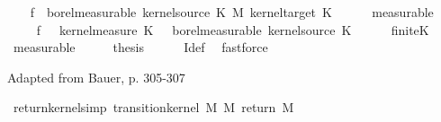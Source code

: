 \begin{isabellebody}
\ \ \isamarkupfalse%
\ {\isachardoublequoteopen}{\isacharquery}{\kern0pt}f{\isacharprime}{\kern0pt}\ {\isasymin}\ borel{\isacharunderscore}{\kern0pt}measurable\ {\isacharparenleft}{\kern0pt}kernel{\isacharunderscore}{\kern0pt}source\ K\ {\isasymOtimes}\isactrlsub M\ kernel{\isacharunderscore}{\kern0pt}target\ K{\isacharparenright}{\kern0pt}{\isachardoublequoteclose}\isanewline
\ \ \ \ \isamarkupfalse%
\ measurable\isanewline
\ \ \isamarkupfalse%
\ \isamarkupfalse%
\ {\isachardoublequoteopen}{\isacharparenleft}{\kern0pt}{\isasymlambda}{\isasymomega}\ {\isasymintegral}\isactrlsup {\isacharplus}{\kern0pt}{\isasymomega}\ {\isacharquery}{\kern0pt}f{\isacharprime}{\kern0pt}\ {\isacharparenleft}{\kern0pt}{\isasymomega}\ {\isasymomega}\ {\isasympartial}kernel{\isacharunderscore}{\kern0pt}measure\ K\ {\isasymomega}\ {\isasymin}\ borel{\isacharunderscore}{\kern0pt}measurable\ {\isacharparenleft}{\kern0pt}kernel{\isacharunderscore}{\kern0pt}source\ K{\isacharparenright}{\kern0pt}{\isachardoublequoteclose}\isanewline
\ \ \ \ \isamarkupfalse%
\ finite{\isacharunderscore}{\kern0pt}K\ \isamarkupfalse%
\ measurable\isanewline
\ \ \isamarkupfalse%
\ \isamarkupfalse%
\ {\isacharquery}{\kern0pt}thesis\isanewline
\ \ \ \ \isamarkupfalse%
\ I{\isacharunderscore}{\kern0pt}def\ \isamarkupfalse%
\ fastforce\isanewline
{}\isamarkupfalse%
%
\endisatagproof
{\isafoldproof}%
%
\isadelimproof
%
\endisadelimproof
%
\isadelimdocument
%
\endisadelimdocument
%
\isatagdocument
%
\isamarkuptrue%
%
\endisatagdocument
{\isafolddocument}%
%
\isadelimdocument
%
\endisadelimdocument
%
\begin{isamarkuptext}%
Adapted from Bauer, p. 305-307%
\end{isamarkuptext}\isamarkuptrue%
\isamarkupfalse%
\ return{\isacharunderscore}{\kern0pt}kernel{\isacharbrackleft}{\kern0pt}simp{\isacharbrackright}{\kern0pt}{\isacharcolon}{\kern0pt}\ {\isachardoublequoteopen}transition{\isacharunderscore}{\kern0pt}kernel\ M\ M\ {\isacharparenleft}{\kern0pt}return\ M{\isacharparenright}{\kern0pt}{\isachardoublequoteclose}\isanewline
%
\isadelimproof
\ \ %

\end{isabellebody}
